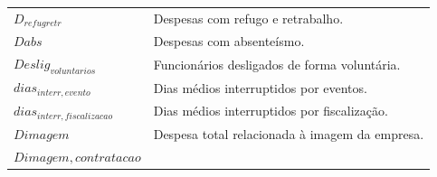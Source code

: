 \documentclass[]{article}
\begin{document}
\begin{longtable}[]{@{}ll@{}}
\begin{minipage}[t]{0.07\columnwidth}\raggedright\strut
\(D_{refugretr}\)\strut
\end{minipage} & \begin{minipage}[t]{0.87\columnwidth}\raggedright\strut
Despesas com refugo e retrabalho.\strut
\end{minipage}\tabularnewline
\begin{minipage}[t]{0.07\columnwidth}\raggedright\strut
\(Dabs\)\strut
\end{minipage} & \begin{minipage}[t]{0.87\columnwidth}\raggedright\strut
Despesas com absenteísmo.\strut
\end{minipage}\tabularnewline
\begin{minipage}[t]{0.07\columnwidth}\raggedright\strut
\(Deslig_{voluntarios}\)\strut
\end{minipage} & \begin{minipage}[t]{0.87\columnwidth}\raggedright\strut
Funcionários desligados de forma voluntária.\strut
\end{minipage}\tabularnewline
\begin{minipage}[t]{0.07\columnwidth}\raggedright\strut
\(dias_{interr, evento}\)\strut
\end{minipage} & \begin{minipage}[t]{0.87\columnwidth}\raggedright\strut
Dias médios interruptidos por eventos.\strut
\end{minipage}\tabularnewline
\begin{minipage}[t]{0.07\columnwidth}\raggedright\strut
\(dias_{interr, fiscalizacao}\)\strut
\end{minipage} & \begin{minipage}[t]{0.87\columnwidth}\raggedright\strut
Dias médios interruptidos por fiscalização.\strut
\end{minipage}\tabularnewline
\begin{minipage}[t]{0.07\columnwidth}\raggedright\strut
\(Dimagem\)\strut
\end{minipage} & \begin{minipage}[t]{0.87\columnwidth}\raggedright\strut
Despesa total relacionada à imagem da empresa.\strut
\end{minipage}\tabularnewline
\begin{minipage}[t]{0.07\columnwidth}\raggedright\strut
\(Dimagem, contratacao\)\strut
\end{minipage} & \begin{minipage}[t]{0.87\columnwidth}\raggedright\strut

\end{minipage}
\end{longtable}
\end{document}
